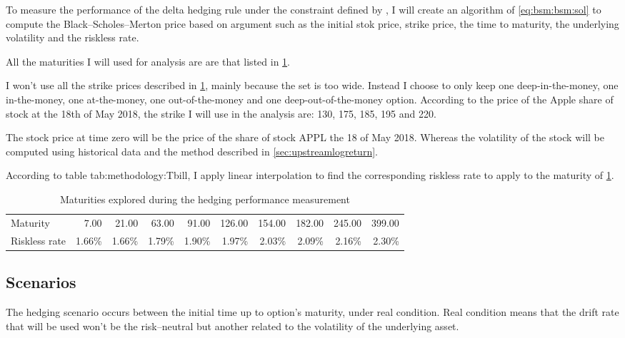 \documentclass[12pt]{report}
\newcommand{\BSM}{Black--Scholes--Merton }
\begin{document}
To measure the performance of the delta hedging rule under the constraint defined by \citet{bs}, I will create an algorithm of \cref{eq:bsm:bsm:sol} to compute the \BSM price based on argument such as the initial stok price, strike price, the time to maturity, the underlying volatility and the riskless rate.

All the maturities I will used for analysis are are that listed in \cref{tab:methodology:maturity}. 

I won't use all the strike prices described in \cref{tab:methodology:maturity}, mainly because the set is too wide. Instead I choose to only keep one deep-in-the-money, one in-the-money, one at-the-money, one out-of-the-money and one deep-out-of-the-money option. According to the price of the Apple share of stock at the 18th of May 2018, the strike I will use in the analysis are: 130, 175, 185, 195 and 220.



The stock price at time zero will be the price of the share of stock APPL the 18 of May 2018. Whereas the volatility of the stock will be computed using historical data and the method described in \cref{sec:upstreamlogreturn}.

According to table {tab:methodology:Tbill}, I apply linear interpolation to find the corresponding riskless rate to apply to the maturity of \cref{tab:methodology:maturity}.

\begin{table}[ht]
\centering
\begin{tabular}{l|rrrrrrrrr}

  \hline
Maturity & 7.00 & 21.00 & 63.00 & 91.00 & 126.00 & 154.00 & 182.00 & 245.00 & 399.00 \\ 
Riskless rate & 1.66\% & 1.66\% & 1.79\% & 1.90\% & 1.97\% & 2.03\% & 2.09\% & 2.16\% & 2.30\% \\
   \hline
\end{tabular}
\caption{Maturities explored during the hedging performance measurement} 
\label{tab:methodology:maturity}
\end{table}


\subsection{Scenarios}
\label{sub:HedgingBSM:Scenarios}

The hedging scenario occurs between the initial time up to option's maturity, under real condition. Real condition means that the drift rate that will be used won't be the risk--neutral but another related to the volatility of the underlying asset.
\end{document}
